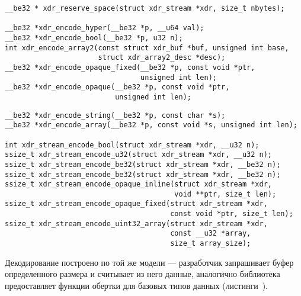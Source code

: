 \begin{lstlisting}[caption={Функции для кодирования (часть 1)}, label={lst:xdr_encode1}]
__be32 * xdr_reserve_space(struct xdr_stream *xdr, size_t nbytes);

__be32 *xdr_encode_hyper(__be32 *p, __u64 val);
__be32 *xdr_encode_bool(__be32 *p, u32 n);
int xdr_encode_array2(const struct xdr_buf *buf, unsigned int base,
                      struct xdr_array2_desc *desc);
__be32 *xdr_encode_opaque_fixed(__be32 *p, const void *ptr,
                                unsigned int len);
__be32 *xdr_encode_opaque(__be32 *p, const void *ptr,
                          unsigned int len);
\end{lstlisting}
\begin{lstlisting}[caption={Функции для кодирования (часть 2)}, label={lst:xdr_encode2}]
__be32 *xdr_encode_string(__be32 *p, const char *s);
__be32 *xdr_encode_array(__be32 *p, const void *s, unsigned int len);

int xdr_stream_encode_bool(struct xdr_stream *xdr, __u32 n);
ssize_t xdr_stream_encode_u32(struct xdr_stream *xdr, __u32 n);
ssize_t xdr_stream_encode_be32(struct xdr_stream *xdr, __be32 n);
ssize_t xdr_stream_encode_be32(struct xdr_stream *xdr, __be32 n);
ssize_t xdr_stream_encode_opaque_inline(struct xdr_stream *xdr,
                                        void **ptr, size_t len);
ssize_t xdr_stream_encode_opaque_fixed(struct xdr_stream *xdr,
                                       const void *ptr, size_t len);
ssize_t xdr_stream_encode_uint32_array(struct xdr_stream *xdr,
                                       const __u32 *array,
                                       size_t array_size);
\end{lstlisting}

Декодирование построено по той же модели --- разработчик запрашивает буфер
определенного размера и считывает из него данные, аналогично библиотека
предоставляет функции обертки для базовых типов данных
(листинги~).


